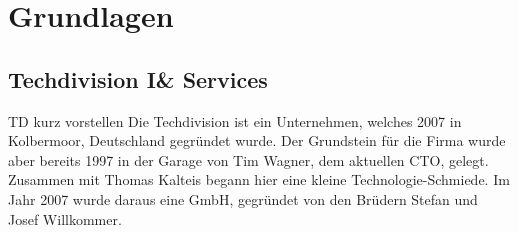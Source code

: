 \chapter{Grundlagen}
\label{c:grun}

\section{Techdivision I\& Services}
\label{s:intro:tech}
TD kurz vorstellen
Die Techdivision ist ein Unternehmen, welches 2007 in Kolbermoor, Deutschland 
gegründet wurde. Der Grundstein für die Firma wurde aber bereits 1997 in der 
Garage von Tim Wagner, dem aktuellen CTO, gelegt. Zusammen mit Thomas
Kalteis begann hier eine kleine Technologie-Schmiede. Im Jahr 2007 wurde 
daraus eine GmbH, gegründet von den Brüdern Stefan und Josef Willkommer. 


